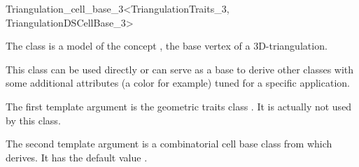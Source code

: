 

\begin{ccRefClass}{Triangulation_cell_base_3<TriangulationTraits_3, TriangulationDSCellBase_3>}

\ccDefinition

The class  is a model of the concept
, the base vertex of a 3D-triangulation.

This class can be used directly or can serve as a base to derive other classes
with some additional attributes (a color for example) tuned for a specific
application.


\ccParameters

The first template argument is the geometric traits class
.  It is actually not used by this class.

The second template argument is a combinatorial cell base class from which
 derives.
It has the default value .

\ccIsModel {}

\ccInheritsFrom {}

\ccSeeAlso

\\



\end{ccRefClass}
